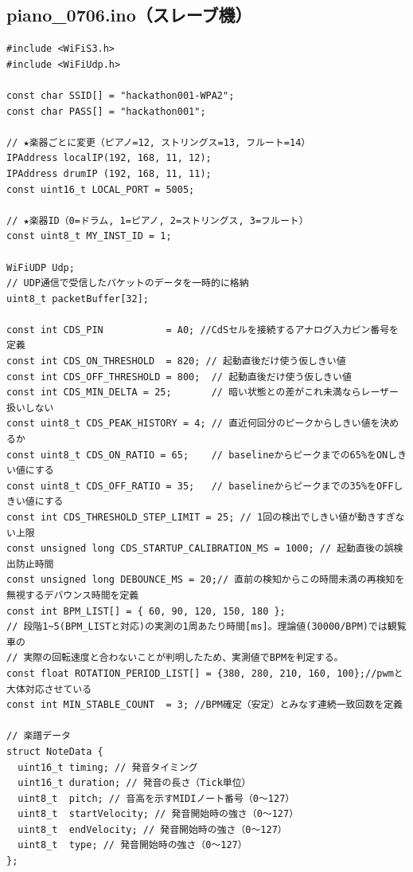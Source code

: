 \subsection{piano\_0706.ino（スレーブ機）}
\begin{lstlisting}[caption={piano\_0706.ino（楽譜データは冒頭2小節のみ掲載）}, label={lst:douki_piano_full}]
#include <WiFiS3.h>
#include <WiFiUdp.h>

const char SSID[] = "hackathon001-WPA2";
const char PASS[] = "hackathon001";

// ★楽器ごとに変更（ピアノ=12, ストリングス=13, フルート=14）
IPAddress localIP(192, 168, 11, 12);
IPAddress drumIP (192, 168, 11, 11);
const uint16_t LOCAL_PORT = 5005;

// ★楽器ID（0=ドラム, 1=ピアノ, 2=ストリングス, 3=フルート）
const uint8_t MY_INST_ID = 1;

WiFiUDP Udp;
// UDP通信で受信したパケットのデータを一時的に格納
uint8_t packetBuffer[32];

const int CDS_PIN           = A0; //CdSセルを接続するアナログ入力ピン番号を定義
const int CDS_ON_THRESHOLD  = 820; // 起動直後だけ使う仮しきい値
const int CDS_OFF_THRESHOLD = 800;  // 起動直後だけ使う仮しきい値
const int CDS_MIN_DELTA = 25;       // 暗い状態との差がこれ未満ならレーザー扱いしない
const uint8_t CDS_PEAK_HISTORY = 4; // 直近何回分のピークからしきい値を決めるか
const uint8_t CDS_ON_RATIO = 65;    // baselineからピークまでの65%をONしきい値にする
const uint8_t CDS_OFF_RATIO = 35;   // baselineからピークまでの35%をOFFしきい値にする
const int CDS_THRESHOLD_STEP_LIMIT = 25; // 1回の検出でしきい値が動きすぎない上限
const unsigned long CDS_STARTUP_CALIBRATION_MS = 1000; // 起動直後の誤検出防止時間
const unsigned long DEBOUNCE_MS = 20;// 直前の検知からこの時間未満の再検知を無視するデバウンス時間を定義
const int BPM_LIST[] = { 60, 90, 120, 150, 180 };
// 段階1~5(BPM_LISTと対応)の実測の1周あたり時間[ms]。理論値(30000/BPM)では観覧車の
// 実際の回転速度と合わないことが判明したため、実測値でBPMを判定する。
const float ROTATION_PERIOD_LIST[] = {380, 280, 210, 160, 100};//pwmと大体対応させている
const int MIN_STABLE_COUNT  = 3; //BPM確定（安定）とみなす連続一致回数を定義

// 楽譜データ
struct NoteData {
  uint16_t timing; // 発音タイミング
  uint16_t duration; // 発音の長さ（Tick単位）
  uint8_t  pitch; // 音高を示すMIDIノート番号（0〜127）
  uint8_t  startVelocity; // 発音開始時の強さ（0〜127）
  uint8_t  endVelocity; // 発音開始時の強さ（0〜127）
  uint8_t  type; // 発音開始時の強さ（0〜127）
};


\end{lstlisting}
